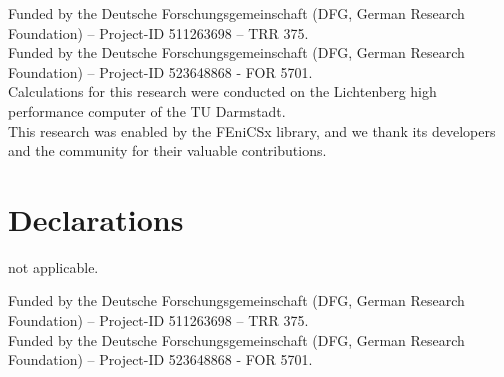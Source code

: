\documentclass[pdflatex,sn-mathphys-num]{sn-jnl}%
\theoremstyle{thmstyleone}%
\theoremstyle{thmstyletwo}%
\theoremstyle{thmstylethree}%
\begin{document}








  Funded by the Deutsche Forschungsgemeinschaft (DFG, German Research Foundation) – Project-ID 511263698 – TRR 375.\\
  Funded by the Deutsche Forschungsgemeinschaft (DFG, German Research Foundation) – Project-ID 523648868 - FOR 5701.\\
  Calculations for this research were conducted on the Lichtenberg high performance computer of the TU Darmstadt. \\
This research was enabled by the FEniCSx library, and we thank its developers and the community for their valuable contributions.\\



\section*{Declarations}

 not applicable.

 Funded by the Deutsche Forschungsgemeinschaft (DFG, German Research Foundation) – Project-ID 511263698 – TRR 375.\\
  Funded by the Deutsche Forschungsgemeinschaft (DFG, German Research Foundation) – Project-ID 523648868 - FOR 5701.\\
\end{document}
